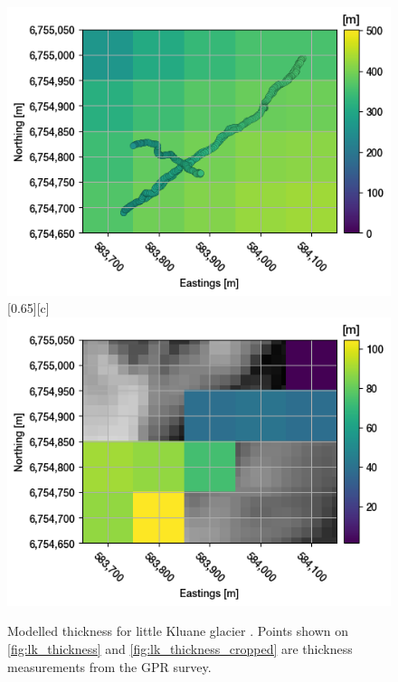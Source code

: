\documentclass[a4, 12pt]{article}
\begin{document}
\begin{figure}[h!]
{{\includegraphics[width=\linewidth]{../imgs/little Kluane glacier, post-surge/consensus_cropped_thickness.png}}
\hfill
{}[0.65\textwidth][c]{
\includegraphics[width=\linewidth]{../imgs/little Kluane glacier, post-surge/consensus_cropped_error.png}}
}
\caption{Modelled thickness for little Kluane glacier \citep{farinotti2019consensus}. Points shown on \ref{fig:lk_thickness} and \ref{fig:lk_thickness_cropped} are thickness measurements from the GPR survey.}
\end{figure}
\end{document}
